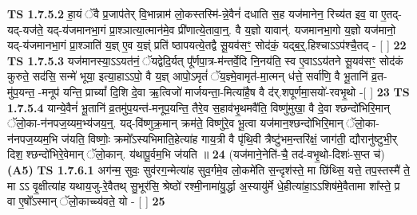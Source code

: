 \documentclass[17pt]{extarticle}
\begin{document}
                  \newline
                                \textbf{ TS 1.7.5.2} \newline
                  हा॒यं ॅवै प्र॒जाप॑तेर् वि॒भान्नाम॑ लो॒कस्तस्मि॑-न्ने॒वैनं॑ दधाति स॒ह यज॑मानेन॒ रिच्य॑त इव॒ वा ए॒तद्-यद्-यज॑ते॒ यद्-य॑जमानभा॒गं प्रा॒श्ञात्या॒त्मान॑मे॒व प्री॑णात्ये॒तावा॒न्॒. वै य॒ज्ञो यावान्॑. यजमानभा॒गो य॒ज्ञो यज॑मानो॒ यद्-य॑जमानभा॒गं प्रा॒श्ञाति॑ य॒ज्ञ् ए॒व य॒ज्ञ्ं प्रति॑ ष्ठापयत्ये॒तद्वै सू॒यव॑सꣳ॒॒ सोद॑कं॒ यद्ब॒र्॒.हिश्चाऽऽप॑श्चै॒तद् - [ ] \textbf{  22} \newline
                  \newline
                                \textbf{ TS 1.7.5.3} \newline
                  यज॑मानस्या॒ऽऽयत॑नं॒ ॅयद्वेदि॒र्यत् पू᳚र्णपा॒त्र-म॑न्तर्वे॒दि नि॒नय॑ति॒ स्व ए॒वाऽऽय॑तने सू॒यव॑सꣳ॒॒ सोद॑कं कुरुते॒ सद॑सि॒ सन्मे॑ भूया॒ इत्या॒हाऽऽपो॒ वै य॒ज्ञ् आपो॒ऽमृतं॑ ॅय॒ज्ञ्मे॒वामृत॑-मा॒त्मन् ध॑त्ते॒ सर्वा॑णि॒ वै भू॒तानि॑ व्र॒त-मु॑प॒यन्त॒ -मनूप॑ यन्ति॒ प्राच्यां᳚ दि॒शि दे॒वा ऋ॒त्विजो॑ मार्जयन्ता॒-मित्या॑है॒ष वै द॑र्.शपूर्णमा॒सयो॑-रवभृ॒थो -[ ] \textbf{  23} \newline
                  \newline
                                \textbf{ TS 1.7.5.4} \newline
                  यान्ये॒वैनं॑ भू॒तानि॑ व्र॒तमु॑प॒यन्त॑-मनूप॒यन्ति॒ तैरे॒व स॒हाव॑भृ॒थमवै॑ति॒ विष्णु॑मुखा॒ वै दे॒वा श्छन्दो॑भिरि॒मान् ॅलो॒का-न॑नपज॒य्यम॒भ्य॑जय॒न्॒. यद्-वि॑ष्णुक्र॒मान् क्रम॑ते॒ विष्णु॑रे॒व भू॒त्वा यज॑मान॒श्छन्दो॑भिरि॒मान् ॅलो॒का-न॑नपज॒य्यम॒भि ज॑यति॒ विष्णोः॒ क्रमो᳚ऽस्यभिमाति॒हेत्या॑ह गाय॒त्री वै पृ॑थि॒वी त्रैष्टु॑भम॒न्तरि॑क्षं॒ जाग॑ती॒ द्यौरानु॑ष्टुभी॒र् दिश॒ श्छन्दो॑भिरे॒वेमान् ॅलो॒कान्. य॑थापू॒र्वम॒भि ज॑यति ॥ \textbf{  24} \newline
                  \newline
                      (यज॑माने॒नेति॑-चै॒ तद॑-वभृ॒थो-दिशः॑-स॒प्त च॑)  \textbf{(A5)} \newline \newline
                                        \textbf{ TS 1.7.6.1} \newline
                  अग॑न्म॒ सुवः॒ सुव॑रग॒न्मेत्या॑ह सुव॒र्गमे॒व लो॒कमे॑ति स॒न्दृश॑स्ते॒ मा छि॑थ्सि॒ यत्ते॒ तप॒स्तस्मै॑ ते॒ मा ऽऽ वृ॒क्षीत्या॑ह यथाय॒जु-रे॒वैतथ् सु॒भूर॑सि॒ श्रेष्ठो॑ रश्मी॒नामा॑यु॒र्द्धा अ॒स्यायु॑र्मे धे॒हीत्या॑हा॒ऽऽशिष॑मे॒वैतामा शा᳚स्ते॒ प्र वा ए॒षो᳚ऽस्मान् ॅलो॒काच्च्य॑वते॒ यो - [ ] \textbf{  25} \newline
                  \newline
\end{document}
